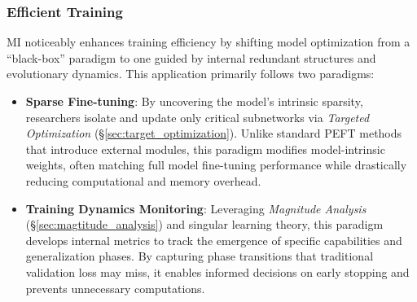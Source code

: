 \documentclass[11pt,letterpaper]{mystyle}
\begin{document}
\subsubsection{Efficient Training}
\label{sec:efficient_training}
\begin{tcolorbox}[takeawaysbox, title={Summary of Application Paradigms}]
  MI noticeably enhances training efficiency by shifting model optimization from a ``black-box'' paradigm to one guided by internal redundant structures and evolutionary dynamics. This application primarily follows two paradigms:
  \begin{itemize}
  \item[1)] \textbf{Sparse Fine-tuning}: By uncovering the model's intrinsic sparsity, researchers isolate and update only critical subnetworks via \textit{Targeted Optimization} (\S\ref{sec:target_optimization}). Unlike standard PEFT methods that introduce external modules, this paradigm modifies model-intrinsic weights, often matching full model fine-tuning performance while drastically reducing computational and memory overhead.
  \item[2)] \textbf{Training Dynamics Monitoring}: Leveraging \textit{Magnitude Analysis} (\S\ref{sec:magtitude_analysis}) and singular learning theory, this paradigm develops internal metrics to track the emergence of specific capabilities and generalization phases. By capturing phase transitions that traditional validation loss may miss, it enables informed decisions on early stopping and prevents unnecessary computations.
  \end{itemize}
  \end{tcolorbox}
  
\end{document}
